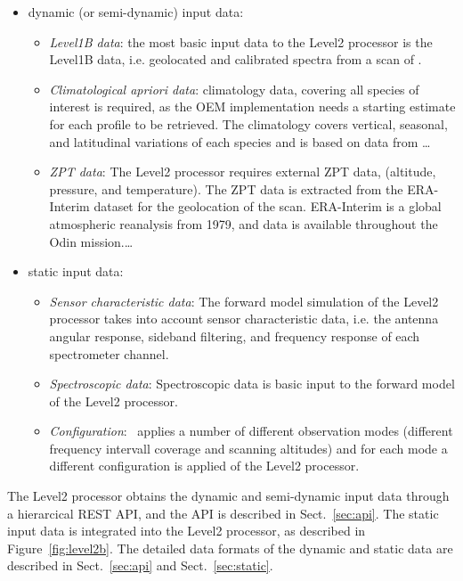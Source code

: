 \begin{itemize}
  \item dynamic (or semi-dynamic) input data:
  \begin{itemize}

    \item \emph{Level1B data}: the most basic input data to the 
    Level2 processor is the Level1B data, i.e. geolocated and 
    calibrated spectra from a scan of \smr.
    
    \item \emph{Climatological \textit{apriori} data}:
    climatology data, covering all species of interest is required, as
    the OEM implementation needs a starting estimate for each profile
    to be retrieved. The climatology covers vertical, seasonal,
    and latitudinal variations of each species and is based on data
    from \dots{}\

    \item \emph{ZPT data}:
    The Level2 processor requires external ZPT data,
    (altitude, pressure, and temperature).
    The ZPT data is extracted from the ERA-Interim dataset for the geolocation
    of the scan. ERA-Interim is a global atmospheric reanalysis from 1979, and
    data is available throughout the Odin mission.\dots{}
  \end{itemize}
  \item static input data:
  \begin{itemize}
    \item \emph{Sensor characteristic data}:
    The forward model simulation of the Level2 processor takes into account
    sensor characteristic data, i.e. the antenna angular response,
    sideband filtering, and frequency response of each spectrometer channel.

    \item \emph{Spectroscopic data}:
    Spectroscopic data is basic input to the forward model of the Level2
    processor.

    \item \emph{Configuration}:
    \smr\ applies a number of different observation modes
    (different frequency intervall coverage and scanning altitudes) 
    and for each mode a different configuration is applied
    of the Level2 processor.
  \end{itemize}
\end{itemize}


The Level2 processor obtains the dynamic 
and semi-dynamic input data through a hierarcical
REST API, and the API is described in Sect.~\ref{sec:api}.
The static input data is integrated into the
Level2 processor, as described in Figure~\ref{fig:level2b}. 
The detailed data formats of the dynamic 
and static data are described in 
Sect.~\ref{sec:api} and Sect.~\ref{sec:static}.


